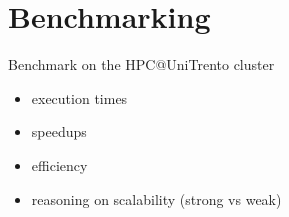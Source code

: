\section{Benchmarking}

Benchmark on the HPC@UniTrento cluster
\begin{itemize}
    \item execution times
    \item speedups
    \item efficiency
    \item reasoning on scalability (strong vs weak)
\end{itemize}
